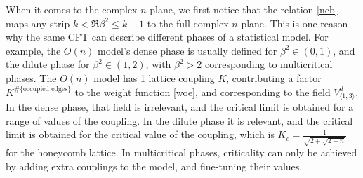 \documentclass[12pt, a4paper]{article}
\theoremstyle{break}
\begin{document}
When it comes to the complex $n$-plane, we first notice that the relation \eqref{ncb} maps any strip $k<\Re \beta^2\leq k+1$ to the full complex $n$-plane. 
This is one reason why the same CFT can describe different phases of a statistical model. For example, the $O(n)$ model's dense phase is usually defined for $\beta^2\in (0,1)$, and the dilute phase for $\beta^2\in (1,2)$, with $\beta^2>2$ corresponding to multicritical phases. The $O(n)$ model has 1 lattice coupling $K$, contributing a factor $K^{\#\{\text{occupied edges}\}}$ to the weight function \eqref{woe}, and corresponding to the field $V^d_{\langle 1,3\rangle}$. In the dense phase, that field is irrelevant, and the critical limit is obtained for a range of values of the coupling. In the dilute phase it is relevant, and the critical limit is obtained for the critical value of the coupling, which is $K_c = \frac{1}{\sqrt{2+\sqrt{2-n}}}$ for the honeycomb lattice. In multicritical phases, criticality can only be achieved by adding extra couplings to the model, and fine-tuning their values. 
\end{document}
